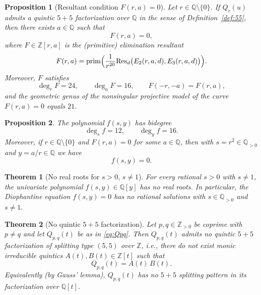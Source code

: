 \documentclass[10pt,a4paper]{amsart}
\newtheorem{proposition}{Proposition}
\newtheorem{theorem}{Theorem}
\begin{document}
\begin{proposition}[Resultant condition $F(r,a)=0$]\label{prop:F}
Let $r\in\mathbb{Q}\setminus\{0\}$.
If $Q_r(u)$ admits a quintic $5+5$ factorization over $\mathbb{Q}$ in the sense of Definition~\ref{def:55}, then there exists $a\in\mathbb{Q}$ such that
\begin{equation}\label{eq:F}
F(r,a)=0,
\end{equation}
where $F\in\mathbb{Z}[r,a]$ is the (primitive) elimination resultant
\[
F(r,a)=\mathrm{prim}\Bigl(\frac{1}{r^{20}}\mathrm{Res}_d\bigl(E_2(r,a,d),E_3(r,a,d)\bigr)\Bigr).
\]
Moreover, $F$ satisfies
\[
\deg_r F=24,\qquad \deg_a F=16,\qquad F(-r,-a)=F(r,a),
\]
and the geometric genus of the nonsingular projective model of the curve $F(r,a)=0$ equals $21$.
\end{proposition}

\begin{proposition}\label{prop:f}
The polynomial $f(s,y)$ has bidegree
\[
\deg_s f=12,\qquad \deg_y f=16.
\]
Moreover, if $r\in\mathbb{Q}\setminus\{0\}$ and $F(r,a)=0$ for some $a\in\mathbb{Q}$, then with $s=r^2\in\mathbb{Q}_{>0}$ and $y=a/r\in\mathbb{Q}$ we have
\[
f(s,y)=0.
\]
\end{proposition}

\begin{theorem}[No real roots for $s>0$, $s\neq 1$]\label{thm:noreal}
For every rational $s>0$ with $s\neq 1$, the univariate polynomial $f(s,y)\in\mathbb{Q}[y]$ has no real roots.
In particular, the Diophantine equation $f(s,y)=0$ has no rational solutions with $s\in\mathbb{Q}_{>0}$ and $s\neq 1$.
\end{theorem}

\begin{theorem}[No quintic $5+5$ factorization]\label{thm:main}
Let $p,q\in\mathbb{Z}_{>0}$ be coprime with $p\neq q$ and let $Q_{p,q}(t)$ be as in \eqref{eq:Qpq}.
Then $Q_{p,q}(t)$ admits no quintic $5+5$ factorization of splitting type $(5,5)$ over\/ $\mathbb{Z}$, i.e., there do not exist monic irreducible quintics $A(t),B(t)\in\mathbb{Z}[t]$ such that
\[
Q_{p,q}(t)=A(t)\,B(t).
\]
Equivalently (by Gauss' lemma), $Q_{p,q}(t)$ has no $5+5$ splitting pattern in its factorization over $\mathbb{Q}[t]$.
\end{theorem}
\end{document}
